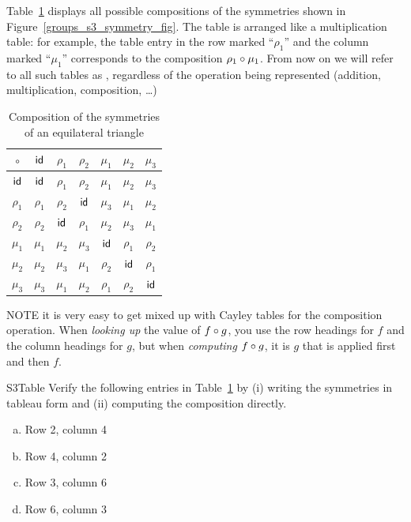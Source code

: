 \noindent
Table~\ref{S3_table} displays  all possible compositions of the symmetries shown in Figure~\ref{groups_s3_symmetry_fig}. The table is arranged like a multiplication table: for example, the table entry in the row marked ``$\rho_1$'' and the 
column marked ``$\mu_1$'' corresponds to the composition $\rho_1 \circ \mu_1$.  From now on we will refer to all such tables as , regardless of the operation being represented (addition, multiplication, composition, \ldots)

\begin{table}
{\small
\begin{center}
\begin{tabular}{c|cccccc}
$\circ$  & ${\sf{i}d}$     & $\rho_1$ & $\rho_2$ & $\mu_1$ & $\mu_2$ & $\mu_3$ \\
\hline
${\sf{i}d}$     & ${\sf{i}d}$     & $\rho_1$ & $\rho_2$ & $\mu_1$ & $\mu_2$ & $\mu_3$ \\
$\rho_1$ & $\rho_1$ & $\rho_2$ & ${\sf{i}d}$     & $\mu_3$ & $\mu_1$ & $\mu_2$ \\
$\rho_2$ & $\rho_2$ & ${\sf{i}d}$     & $\rho_1$ & $\mu_2$ & $\mu_3$ & $\mu_1$ \\
$\mu_1$  & $\mu_1$  & $\mu_2$  & $\mu_3$  & ${\sf{i}d}$    & $\rho_1$& $\rho_2$\\
$\mu_2$  & $\mu_2$  & $\mu_3$  & $\mu_1$  & $\rho_2$& ${\sf{i}d}$    & $\rho_1$\\
$\mu_3$  & $\mu_3$  & $\mu_1$  & $\mu_2$  & $\rho_1$& $\rho_2$& ${\sf{i}d}$
\end{tabular}
\end{center}
}
\caption{Composition of the symmetries of an equilateral triangle}
\label{S3_table}
\end{table}

\begin{rem}\label{remark:symmetries:comp_order}
NOTE it is very easy to get mixed up with Cayley tables for the composition operation. When \emph{looking up} the value of $f \circ g$, you use the row headings for $f$ and the column headings for  $g$, but when \emph{computing} $f \circ g$, it is $g$ that is applied first and then $f$.
\end{rem}

\begin{exercise}{S3Table}
Verify the following entries in Table~\ref{S3_table} by (i) writing the symmetries in tableau form and (ii) computing the composition directly.
\begin{enumerate}[(a)]
\item
Row 2, column 4
\item
Row 4, column 2
\item
Row 3, column 6
\item
Row 6, column 3
\end{enumerate}
\end{exercise}

